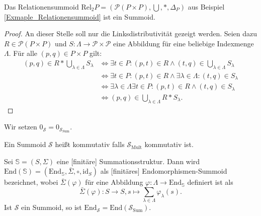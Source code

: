 \documentclass{article}
\begin{document}
\begin{theorem}
  Das Relationensummoid $\text{Rel}_2P = (\mathcal{P}(P \times P), \bigcup, \ast, \Delta_P)$ aus Beispiel \ref{Exmaple_Relationensummoid}
  ist ein Summoid.
\end{theorem}
\begin{proof}
  An dieser Stelle soll nur die Linksdistributivität gezeigt werden.
  Seien dazu $R \in \mathcal{P}(P \times P)$ und 
  $S \colon \Lambda \to \mathcal{P \times P}$ eine Abbildung für eine beliebige Indexmenge $\Lambda$.
  Für alle $(p, q) \in P \times P$ gilt: 
  \begin{align*}
    (p, q) \in R \ast \bigcup_{\lambda \in \Lambda}S_\lambda &\iff \exists t \in P \colon (p, t) \in R \wedge (t, q) \in \bigcup_{\lambda \in \Lambda}S_\lambda \\
    &\iff \exists t \in P \colon (p, t) \in R \wedge \exists \lambda \in \Lambda \colon (t, q) \in S_\lambda \\
    &\iff \exists \lambda \in \Lambda \exists t \in P \colon (p, t) \in R \wedge  (t, q) \in S_\lambda \\
    &\iff (p, q) \in \bigcup_{\lambda \in \Lambda}R \ast S_\lambda.
  \end{align*}
\end{proof}

\begin{definition}
  Wir setzen $0_\mathcal{S} = 0_{\mathcal{S}_\text{Sum}}$.
\end{definition}

\begin{definition}
  Ein Summoid $\mathcal{S}$ heißt kommutativ falls $\mathcal{S}_\text{Mult}$ kommutativ ist.
\end{definition}

\begin{definition}
  Sei $\mathbb{S} = (S, \Sigma)$ eine [finitäre] Summationsstruktur.
  Dann wird $\text{End}(\mathbb{S}) = (\text{End}_\mathbb{S}, \bar\Sigma, \circ, \text{id}_S)$ als [finitäres] Endomorphismen-Summoid bezeichnet,
  wobei $\bar\Sigma(\varphi)$ für eine Abbildung $\varphi \colon \Lambda \to \text{End}_\mathbb{S}$ definiert ist als
  \begin{equation*}
    \bar\Sigma(\varphi) \colon S \to S, s \mapsto \sum_{\lambda \in \Lambda}\varphi_\lambda(s).
  \end{equation*}
  Ist $\mathcal{S}$ ein Summoid,
  so ist $\text{End}_\mathcal{S} = \text{End}(\mathcal{S}_\text{Sum})$.
\end{definition}
\end{document}
